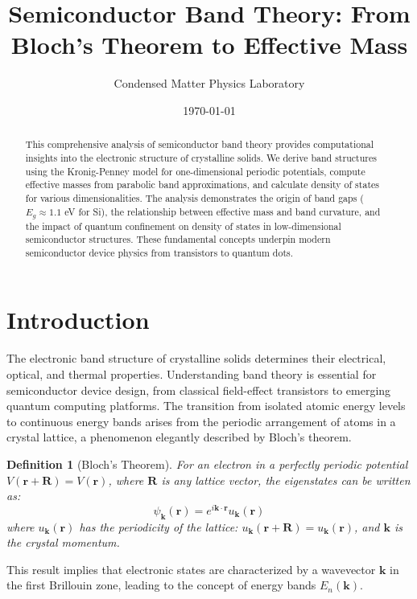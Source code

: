 \documentclass[11pt,a4paper]{article}
\title{Semiconductor Band Theory: From Bloch's Theorem to Effective Mass}
\author{Condensed Matter Physics Laboratory}
\date{\today}
\newtheorem{definition}{Definition}[section]
\begin{document}
\maketitle

\begin{abstract}
This comprehensive analysis of semiconductor band theory provides computational insights into
the electronic structure of crystalline solids. We derive band structures using the
Kronig-Penney model for one-dimensional periodic potentials, compute effective masses from
parabolic band approximations, and calculate density of states for various dimensionalities.
The analysis demonstrates the origin of band gaps ($E_g \approx 1.1$ eV for Si), the
relationship between effective mass and band curvature, and the impact of quantum confinement
on density of states in low-dimensional semiconductor structures. These fundamental concepts
underpin modern semiconductor device physics from transistors to quantum dots.
\end{abstract}

\section{Introduction}

The electronic band structure of crystalline solids determines their electrical, optical, and
thermal properties. Understanding band theory is essential for semiconductor device design,
from classical field-effect transistors to emerging quantum computing platforms. The
transition from isolated atomic energy levels to continuous energy bands arises from the
periodic arrangement of atoms in a crystal lattice, a phenomenon elegantly described by
Bloch's theorem.

\begin{definition}[Bloch's Theorem]
For an electron in a perfectly periodic potential $V(\mathbf{r} + \mathbf{R}) = V(\mathbf{r})$,
where $\mathbf{R}$ is any lattice vector, the eigenstates can be written as:
\begin{equation}
\psi_{\mathbf{k}}(\mathbf{r}) = e^{i\mathbf{k} \cdot \mathbf{r}} u_{\mathbf{k}}(\mathbf{r})
\end{equation}
where $u_{\mathbf{k}}(\mathbf{r})$ has the periodicity of the lattice: $u_{\mathbf{k}}(\mathbf{r} + \mathbf{R}) = u_{\mathbf{k}}(\mathbf{r})$, and $\mathbf{k}$ is the crystal momentum.
\end{definition}

This result implies that electronic states are characterized by a wavevector $\mathbf{k}$ in
the first Brillouin zone, leading to the concept of energy bands $E_n(\mathbf{k})$.
\end{document}
